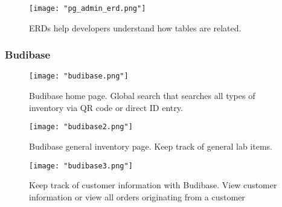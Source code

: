 \documentclass{article}
\begin{document}
\begin{figure}[h!]
    \centering
    \texttt{[image: "pg\_admin\_erd.png"]}
    \caption{ERDs help developers understand how tables are related.}
    \label{fig:pg_admin_erd}
\end{figure}
\FloatBarrier

\subsubsection{Budibase}
\begin{figure}[h!]
    \centering
    \texttt{[image: "budibase.png"]}
    \caption{Budibase home page. Global search that searches all types of inventory via QR code or direct ID entry.}
    \label{fig:budibase_home}
\end{figure}
\begin{figure}[h!]
    \centering
    \texttt{[image: "budibase2.png"]}
    \caption{Budibase general inventory page. Keep track of general lab items.}
    \label{fig:budibase_gen_inv}
\end{figure}
\begin{figure}[h!]
    \centering
    \texttt{[image: "budibase3.png"]}
    \caption{Keep track of customer information with Budibase. View customer information or view all orders originating from a
    customer}
    \label{fig:budibase_customers}
\end{figure}

\FloatBarrier
\end{document}

